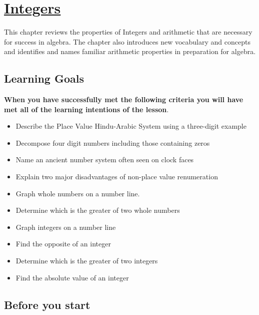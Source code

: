 
\label{chap:numbersystems}




\chapter{\protect\hyperlink{chap:\thechapter}{Integers}}

\minitoc
This chapter reviews the properties of Integers and arithmetic that are
necessary for success in algebra. The chapter also introduces new vocabulary and concepts  and identifies and names familiar arithmetic
properties in preparation for algebra.


\section{Learning Goals}
\begin{tcolorbox}
 \textbf{When you have successfully met the following criteria you will have met all of the learning intentions of the lesson}.
\tcblower
\begin{itemize}
\item Describe the Place Value  Hindu-Arabic System using a three-digit example
\item Decompose   four digit numbers including those containing zeros
\item Name an ancient number system often seen on clock faces
\item Explain two major disadvantages of non-place value renumeration
    \item Graph whole numbers on a number line.
   \item Determine which is the greater of two whole numbers
   \item Graph integers on a number line
   \item Find the opposite of an integer
   \item Determine which is the greater of two integers
   \item Find the absolute value of an integer
\end{itemize}
\end{tcolorbox}



\section{Before you start}




